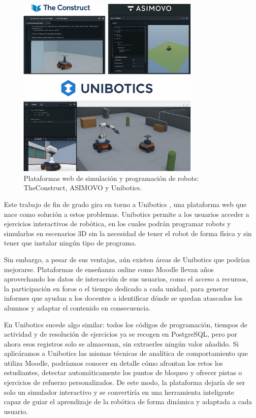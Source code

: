 \documentclass[a4paper, 12pt]{book}
\begin{document}
\begin{figure}[H]
    \centering
    \includegraphics[width=0.8\textwidth]{img/roboticas.png}
    \caption{Plataformas web de simulación y programación de robots: TheConstruct, ASIMOVO y Unibotics.}
    \label{fig:plataformas_robotica}
\end{figure}

Este trabajo de fin de grado gira en torno a Unibotics \cite{uniboticsWebsite}, una plataforma web que nace como solución a estos problemas. Unibotics permite a los usuarios acceder a ejercicios interactivos de robótica, en los cuales podrán programar robots y simularlos en escenarios 3D sin la necesidad de tener el robot de forma física y sin tener que instalar ningún tipo de programa.

Sin embargo, a pesar de sus ventajas, aún existen áreas de Unibotics que podrían mejorarse. Plataformas de enseñanza online como Moodle \cite{einhardt2016moodle} llevan años aprovechando los datos de interacción de sus usuarios, como el acceso a recursos, la participación en foros o el tiempo dedicado a cada unidad, para generar informes que ayudan a los docentes a identificar dónde se quedan atascados los alumnos y adaptar el contenido en consecuencia.

En Unibotics sucede algo similar: todos los códigos de programación, tiempos de actividad y de resolución de ejercicios ya se recogen en PostgreSQL, pero por ahora esos registros solo se almacenan, sin extraerles ningún valor añadido. Si aplicáramos a Unibotics las mismas técnicas de analítica de comportamiento que utiliza Moodle, podríamos conocer en detalle cómo afrontan los retos los estudiantes, detectar automáticamente los puntos de bloqueo y ofrecer pistas o ejercicios de refuerzo personalizados. De este modo, la plataforma dejaría de ser solo un simulador interactivo y se convertiría en una herramienta inteligente capaz de guiar el aprendizaje de la robótica de forma dinámica y adaptada a cada usuario.
\end{document}
